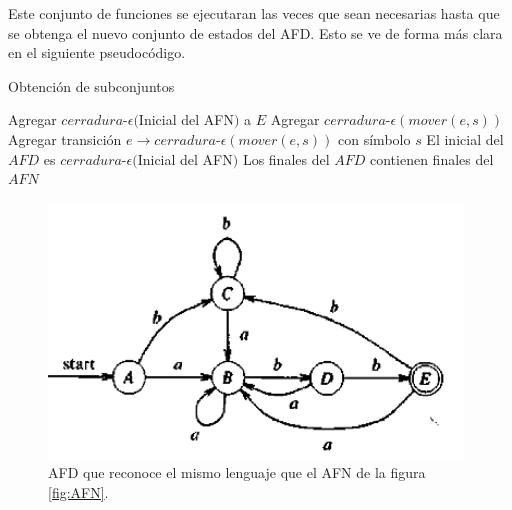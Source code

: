 \documentclass[titlepage]{article}
\begin{document}
Este conjunto de funciones se ejecutaran las veces que sean necesarias hasta que se obtenga el nuevo conjunto de estados del AFD. Esto se ve de forma más clara en el siguiente pseudocódigo.
\begin{algorithm}
	\caption{Obtención de subconjuntos}
	\begin{algorithmic} 
		\STATE Agregar $cerradura$-$\epsilon($Inicial del AFN$)$ a $E$
		\STATE Agregar $cerradura$-$\epsilon(mover(e, s))$
		\STATE Agregar transición $e \rightarrow cerradura$-$\epsilon(mover(e, s))$ con símbolo $s$
		\ENDFOR
		\ENDFOR
		\STATE El inicial del $AFD$ es $cerradura$-$\epsilon($Inicial del AFN$)$
		\STATE Los finales del $AFD$ contienen finales del $AFN$
	\end{algorithmic}
\end{algorithm} 

\begin{figure}[H]
        \begin{center}
        \includegraphics[width=11cm]{AFD.png}
        \caption{AFD que reconoce el mismo lenguaje que el AFN de la figura \ref{fig:AFN}.}
        \label{fig:AFD}
        \end{center}
    \end{figure}
\end{document}
